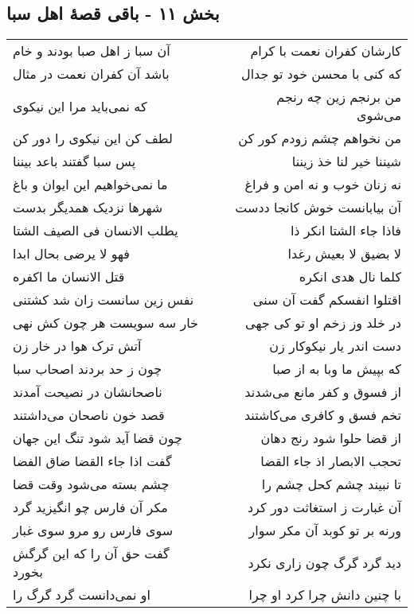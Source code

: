 \begin{center}
\section*{بخش ۱۱ - باقی قصهٔ اهل سبا}
\label{sec:sh011}
\begin{longtable}{l p{0.5cm} r}
آن سبا ز اهل صبا بودند و خام
&&
کارشان کفران نعمت با کرام
\\
باشد آن کفران نعمت در مثال
&&
که کنی با محسن خود تو جدال
\\
که نمی‌باید مرا این نیکوی
&&
من برنجم زین چه رنجم می‌شوی
\\
لطف کن این نیکوی را دور کن
&&
من نخواهم چشم زودم کور کن
\\
پس سبا گفتند باعد بیننا
&&
شیننا خیر لنا خذ زیننا
\\
ما نمی‌خواهیم این ایوان و باغ
&&
نه زنان خوب و نه امن و فراغ
\\
شهرها نزدیک همدیگر بدست
&&
آن بیابانست خوش کانجا ددست
\\
یطلب الانسان فی الصیف الشتا
&&
فاذا جاء الشتا انکر ذا
\\
فهو لا یرضی بحال ابدا
&&
لا بضیق لا بعیش رغدا
\\
قتل الانسان ما اکفره
&&
کلما نال هدی انکره
\\
نفس زین سانست زان شد کشتنی
&&
اقتلوا انفسکم گفت آن سنی
\\
خار سه سویست هر چون کش نهی
&&
در خلد وز زخم او تو کی جهی
\\
آتش ترک هوا در خار زن
&&
دست اندر یار نیکوکار زن
\\
چون ز حد بردند اصحاب سبا
&&
که بپیش ما وبا به از صبا
\\
ناصحانشان در نصیحت آمدند
&&
از فسوق و کفر مانع می‌شدند
\\
قصد خون ناصحان می‌داشتند
&&
تخم فسق و کافری می‌کاشتند
\\
چون قضا آید شود تنگ این جهان
&&
از قضا حلوا شود رنج دهان
\\
گفت اذا جاء القضا ضاق الفضا
&&
تحجب الابصار اذ جاء القضا
\\
چشم بسته می‌شود وقت قضا
&&
تا نبیند چشم کحل چشم را
\\
مکر آن فارس چو انگیزید گرد
&&
آن غبارت ز استغاثت دور کرد
\\
سوی فارس رو مرو سوی غبار
&&
ورنه بر تو کوبد آن مکر سوار
\\
گفت حق آن را که این گرگش بخورد
&&
دید گرد گرگ چون زاری نکرد
\\
او نمی‌دانست گرد گرگ را
&&
با چنین دانش چرا کرد او چرا
\\

\end{longtable}
\end{center}
